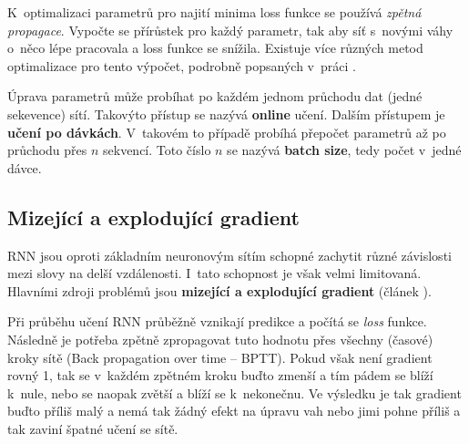 
K~optimalizaci parametrů pro najití minima loss funkce se používá \emph{zpětná propagace}. Vypočte se přírůstek pro každý parametr, tak aby síť s~novými váhy o~něco lépe pracovala a loss funkce se snížila. Existuje více různých metod optimalizace pro tento výpočet, podrobně popsaných v~práci \cite{gradientDescent}.

Úprava parametrů může probíhat po každém jednom průchodu dat (jedné sekevence) sítí. Takovýto přístup se nazývá \textbf{online} učení. Dalším přístupem je \textbf{učení po dávkách}. V~takovém to případě probíhá přepočet parametrů až po průchodu přes $n$ sekvencí. Toto číslo $n$ se nazývá \textbf{batch size}, tedy počet  v~jedné dávce.

%
%
%


\subsection{Mizející a explodující gradient} \label{subsection:gradient}
RNN jsou oproti základním neuronovým sítím schopné zachytit různé závislosti mezi slovy na delší vzdálenosti. I~tato schopnost je však velmi limitovaná. Hlavními zdroji problémů jsou \textbf{mizející a explodující gradient} (článek \cite{gradientProblems}).


Při průběhu učení RNN průběžně vznikají predikce a počítá se \emph{loss} funkce. Následně je potřeba zpětně zpropagovat tuto hodnotu přes všechny (časové) kroky sítě (Back propagation over time -- BPTT). Pokud však není gradient rovný 1, tak se v~každém zpětném kroku buďto zmenší a tím pádem se blíží k~nule, nebo se naopak zvětší a blíží se k~nekonečnu. Ve výsledku je tak gradient buďto příliš malý a nemá tak žádný efekt na úpravu vah nebo jimi pohne příliš a tak zaviní špatné učení se sítě.

